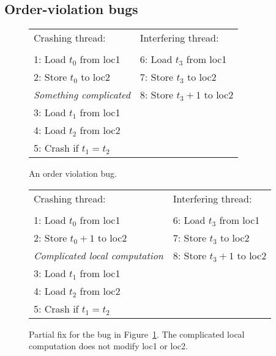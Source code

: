 \subsection{Order-violation bugs}

\begin{figure}
\begin{centering}
\hfill
\begin{tabular}{p{8cm}l}
Crashing thread:\hfill         & Interfering thread: \\
\\
1: Load $t_0$ from loc1        & 6: Load $t_3$ from loc1 \\
2: Store $t_0$ to loc2         & 7: Store $t_3$ to loc2 \\
\textit{Something complicated} & 8: Store $t_3 + 1$ to loc2 \\
3: Load $t_1$ from loc1        & \\
4: Load $t_2$ from loc2        & \\
5: Crash if $t_1 = t_2$ & \\
\end{tabular}
\hfill
\end{centering}
\caption{An order violation bug.}
\label{fig:mandatory_concurrency1}
\end{figure}

\begin{figure}
\begin{centering}
\hfill
\begin{tabular}{p{8cm}l}
Crashing thread:          & Interfering thread: \\
\\
1: Load $t_0$ from loc1        & 6: Load $t_3$ from loc1 \\
2: Store $t_0+1$ to loc2       & 7: Store $t_3$ to loc2 \\
\textit{Complicated local computation} & 8: Store $t_3 + 1$ to loc2 \\
3: Load $t_1$ from loc1        & \\
4: Load $t_2$ from loc2        & \\
5: Crash if $t_1 = t_2$ & \\
\end{tabular}
\hfill
\end{centering}
\caption{Partial fix for the bug in
  Figure~\ref{fig:mandatory_concurrency1}.  The complicated local
  computation does not modify loc1 or loc2.}
\label{fig:mandatory_concurrency2}
\end{figure}

